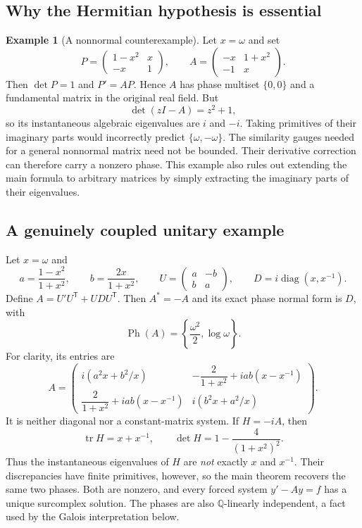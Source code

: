 \documentclass[11pt,a4paper]{article}
\numberwithin{equation}{section}
\theoremstyle{definition}
\newtheorem{example}[example]{Example}
\theoremstyle{remark}
\newcommand{\Q}{\mathbb Q}
\newcommand{\diag}{\operatorname{diag}}
\newcommand{\tr}{\operatorname{tr}}
\newcommand{\Specph}{\operatorname{Ph}}
\begin{document}
\subsection{Why the Hermitian hypothesis is essential}
\begin{example}[A nonnormal counterexample]\label{ex:nonnormal}
Let $x=\omega$ and set
\[
 P=\begin{pmatrix}1-x^2&x\\-x&1\end{pmatrix},\qquad
 A=\begin{pmatrix}-x&1+x^2\\-1&x\end{pmatrix}.
\]
Then $\det P=1$ and $P'=AP$. Hence $A$ has phase multiset $\{0,0\}$ and a
fundamental matrix in the original real field. But
\[
 \det(zI-A)=z^2+1,
\]
so its instantaneous algebraic eigenvalues are $i$ and $-i$.
Taking primitives of their imaginary parts would incorrectly predict
$\{\omega,-\omega\}$. The similarity gauges needed for a general
nonnormal matrix need not be bounded. Their derivative correction can
therefore carry a nonzero phase. This example also rules out extending the
main formula to arbitrary matrices by simply extracting the imaginary
parts of their eigenvalues.
\end{example}

\subsection{A genuinely coupled unitary example}\label{subsec:unitaryexample}
Let $x=\omega$ and
\[
 a=\frac{1-x^2}{1+x^2},\qquad b=\frac{2x}{1+x^2},\qquad
 U=\begin{pmatrix}a&-b\\b&a\end{pmatrix},\qquad
 D=i\diag(x,x^{-1}).
\]
Define $A=U'U^{\mathsf T}+UDU^{\mathsf T}$. Then $A^*=-A$ and its exact
phase normal form is $D$, with
\[
 \Specph(A)=\left\{\frac{\omega^2}{2},\log\omega\right\}.
\]
For clarity, its entries are
\[
 A=\begin{pmatrix}
 i(a^2x+b^2/x)&-\dfrac{2}{1+x^2}+iab(x-x^{-1})\\[4pt]
 \dfrac{2}{1+x^2}+iab(x-x^{-1})&i(b^2x+a^2/x)
 \end{pmatrix}.
\]
It is neither diagonal nor a constant-matrix system. If $H=-iA$, then
\[
 \tr H=x+x^{-1},\qquad
 \det H=1-\frac{4}{(1+x^2)^2}.
\]
Thus the instantaneous eigenvalues of $H$ are \emph{not} exactly $x$ and
$x^{-1}$. Their discrepancies have finite primitives, however, so the main
theorem recovers the same two phases. Both are nonzero, and every forced
system $y'-Ay=f$ has a unique surcomplex solution. The phases are also
$\Q$-linearly independent, a fact used by the Galois interpretation below.
\end{document}
